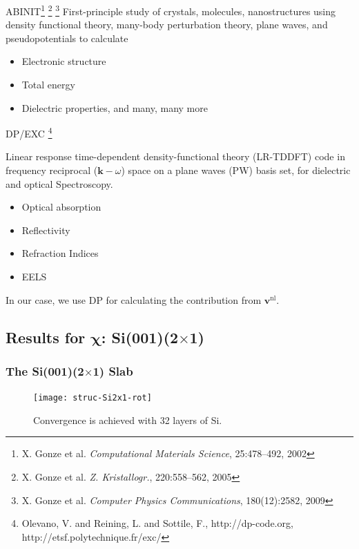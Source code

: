 \documentclass{beamer}
\begin{document}
\begin{frame}
\begin{block}{ABINIT\footnote{X. Gonze et al. 
\emph{Computational Materials Science}, 25:478--492, 2002} 
\footnote{X. Gonze et al. \emph{Z. Kristallogr.}, 220:558--562, 2005} 
\footnote{X. Gonze et al. 
\emph{Computer Physics Communications}, 180(12):2582, 2009}}
First-principle study of crystals, molecules, nanostructures using density
functional theory, many-body perturbation theory, plane waves, and
pseudopotentials to calculate
\begin{itemize}
\item Electronic structure
\item Total energy
\item Dielectric properties, and many, many more
\end{itemize}
\end{block}
\end{frame}

\begin{frame}
\begin{block}{DP/EXC%
\footnote{Olevano, V. and Reining, L. and Sottile, F.,
http://dp-code.org, http://etsf.polytechnique.fr/exc/}}

Linear response time-dependent density-functional theory (LR-TDDFT) code in
frequency reciprocal ($\mathbf{k}-\omega$) space on a plane waves (PW) basis
set, for dielectric and optical Spectroscopy.
\begin{itemize}
\item Optical absorption
\item Reflectivity
\item Refraction Indices
\item EELS
\end{itemize}
\end{block}
In our case, we use DP for calculating the contribution from
$\mathbf{v}^\mathrm{nl}$.
\end{frame}



\subsection{Results for \texorpdfstring{$\boldsymbol{\chi}$}{X}:
\texorpdfstring{Si(001)(2$\times$1)}{Si(001)(2x1)}}

\begin{frame}
\frametitle{The Si(001)(2$\times$1) Slab}
\begin{figure}
\centering
\texttt{[image: struc-Si2x1-rot]}
\vspace*{-0.4cm}
\caption{Convergence is achieved with 32 layers of Si.}
\end{figure}
\end{frame}
\end{document}

